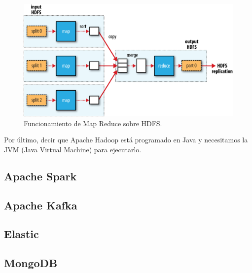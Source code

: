 \begin{figure}[htp]
\centering
\includegraphics[scale=0.28]{Imagenes/hadoop1.png}
\caption{Funcionamiento de Map Reduce sobre HDFS. }
\label{hdImg1}
\end{figure}

Por último, decir que Apache Hadoop está programado en Java y necesitamos la JVM (Java Virtual Machine) para ejecutarlo.\par


\subsection{Apache Spark\label{Spark}}
\subsection{Apache Kafka\label{Kafka}}
\subsection{Elastic\label{Elastic}}
\subsection{MongoDB\label{MongoDB}}
